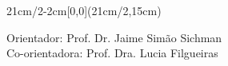 


\begin{textblock*}{21cm/2-2cm}[0,0](21cm/2,15cm)
  \begin{flushleft}
    

    {\large
      Orientador: Prof. Dr. Jaime Simão Sichman \\
        Co-orientadora: Prof. Dra. Lucia Filgueiras
    }
  \end{flushleft}
\end{textblock*}

